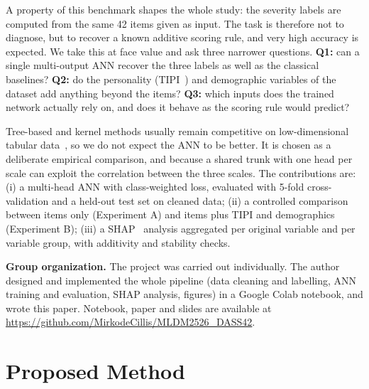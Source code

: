 \documentclass[conference,compsoc]{IEEEtran}
\begin{document}
A property of this benchmark shapes the whole study: the severity labels are computed from the same 42 items given as input.
The task is therefore not to diagnose, but to recover a known additive scoring rule, and very high accuracy is expected.
We take this at face value and ask three narrower questions.
\textbf{Q1:} can a single multi-output ANN recover the three labels as well as the classical baselines?
\textbf{Q2:} do the personality (TIPI~\cite{tipi}) and demographic variables of the dataset add anything beyond the items?
\textbf{Q3:} which inputs does the trained network actually rely on, and does it behave as the scoring rule would predict?

Tree-based and kernel methods usually remain competitive on low-dimensional tabular data~\cite{gri}, so we do not expect the ANN to be better.
It is chosen as a deliberate empirical comparison, and because a shared trunk with one head per scale can exploit the correlation between the three scales.
The contributions are: (i) a multi-head ANN with class-weighted loss, evaluated with 5-fold cross-validation and a held-out test set on cleaned data; (ii) a controlled comparison between items only (Experiment A) and items plus TIPI and demographics (Experiment B); (iii) a SHAP~\cite{shap} analysis aggregated per original variable and per variable group, with additivity and stability checks.

\textbf{Group organization.}
The project was carried out individually. The author designed and implemented the whole pipeline (data cleaning and labelling, ANN training and evaluation, SHAP analysis, figures) in a Google Colab notebook, and wrote this paper.
Notebook, paper and slides are available at \url{https://github.com/MirkodeCillis/MLDM2526_DASS42}.

\section{Proposed Method}
\end{document}
